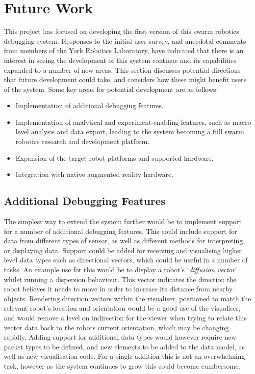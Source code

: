 
\section{Future Work} \label{FutureWork}

This project has focused on developing the first version of this swarm robotics debugging system. Responses to the initial user survey, and anecdotal comments from members of the York Robotics Laboratory, have indicated that there is an interest in seeing the development of this system continue and its capabilities expanded to a number of new areas. This section discusses potential directions that future development could take, and considers how these might benefit users of the system. Some key areas for potential development are as follows:

\begin{itemize}
 \item Implementation of additional debugging features.
 \item Implementation of analytical and experiment-enabling features, such as macro level analysis and data export, leading to the system becoming a full swarm robotics research and development platform.
 \item Expansion of the target robot platforms and supported hardware.
 \item Integration with native augmented reality hardware.
\end{itemize}


\subsection{Additional Debugging Features}

The simplest way to extend the system further would be to implement support for a number of additional debugging features. This could include support for data from different types of sensor, as well as different methods for interpreting or displaying data. Support could be added for receiving and visualising higher level data types such as directional vectors, which could be useful in a number of tasks. An example use for this would be to display a robot's `\textit{diffusion vector}' whilst running a dispersion behaviour. This vector indicates the direction the robot believes it needs to move in order to increase its distance from nearby objects. Rendering direction vectors within the visualiser, positioned to match the relevant robot's location and orientation would be a good use of the visualiser, and would remove a level on indirection for the viewer when trying to relate this vector data back to the robots current orientation, which may be changing rapidly. Adding support for additional data types would however require new packet types to be defined, and new elements to be added to the data model, as well as new visualisation code. For a single addition this is not an overwhelming task, however as the system continues to grow this could become cumbersome.

